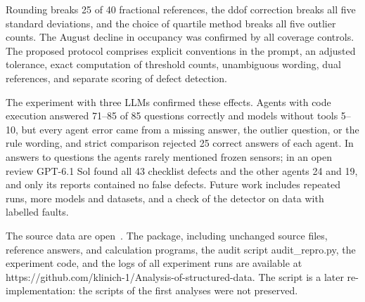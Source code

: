 \documentclass[default]{subfiles}
\begin{document}
{Rounding breaks 25 of 40 fractional references, the ddof correction breaks all five standard deviations, and the choice of quartile method breaks all five outlier counts. The August decline in occupancy was confirmed by all coverage controls. The proposed protocol comprises explicit conventions in the prompt, an adjusted tolerance, exact computation of threshold counts, unambiguous wording, dual references, and separate scoring of defect detection.

The experiment with three LLMs confirmed these effects. Agents with code execution answered 71--85 of 85 questions correctly and models without tools 5--10, but every agent error came from a missing answer, the outlier question, or the rule wording, and strict comparison rejected 25 correct answers of each agent. In answers to questions the agents rarely mentioned frozen sensors; in an open review GPT-6.1 Sol found all 43 checklist defects and the other agents 24 and 19, and only its reports contained no false defects. Future work includes repeated runs, more models and datasets, and a check of the detector on data with labelled faults.

\begin{dataavailability}
The source data are open~\cite{emt,madrid}. The package, including unchanged source files, reference answers, and calculation programs, the audit script audit\_repro.py, the experiment code, and the logs of all experiment runs are available at https://github.com/klinich-1/Analysis-of-structured-data. The script is a later re-implementation: the scripts of the first analyses were not preserved.
\end{dataavailability}

}
\end{document}
